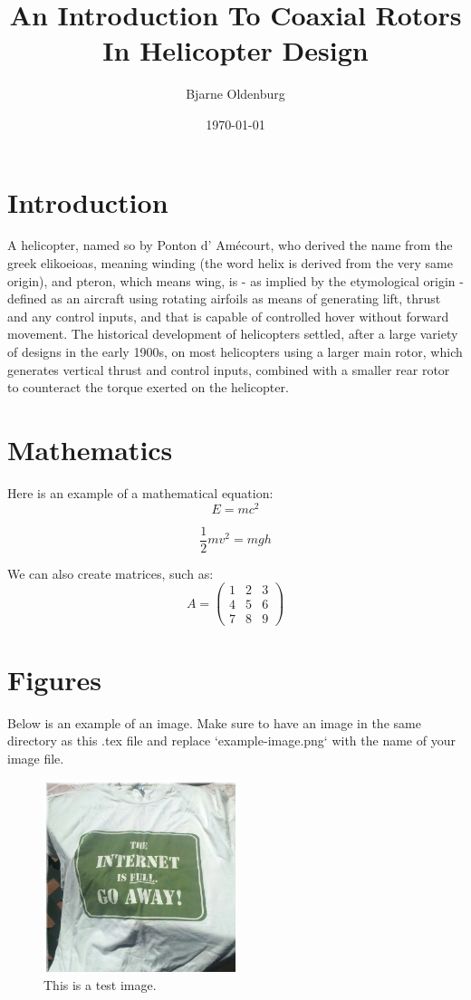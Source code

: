 \documentclass[11pt, a4paper]{scrartcl}
\title{An Introduction To Coaxial Rotors In Helicopter Design}
\author{Bjarne Oldenburg}
\date{\today}
\begin{document}
\maketitle

\section{Introduction}
A helicopter, named so by Ponton d' Amécourt, who derived the name from the greek elikoeioas, meaning winding (the word helix is derived from the very same origin), 
and pteron, which means wing, is - as implied by the etymological origin - defined as an aircraft using rotating airfoils as means of generating lift, thrust and any control inputs, and that is capable of controlled hover without forward movement.
The historical development of helicopters settled, after a large variety of designs in the early 1900s, on most helicopters using a larger main rotor, 
which generates vertical thrust and control inputs, combined with a smaller rear rotor to counteract the torque exerted on the helicopter.

\section{Mathematics}
Here is an example of a mathematical equation:
\begin{equation}
    E = mc^2
\end{equation}

\begin{equation}
    \frac{1}{2}mv^2 = mgh
\end{equation} 

We can also create matrices, such as:
\[
    A = \begin{pmatrix}
    1 & 2 & 3 \\
    4 & 5 & 6 \\
    7 & 8 & 9
    \end{pmatrix}
\]

\section{Figures}
Below is an example of an image. Make sure to have an image in the same directory as this .tex file and replace `example-image.png` with the name of your image file.

\begin{figure}[!ht]
    \centering
    \includegraphics[width=0.5\textwidth]{test.png}
    \caption{This is a test image.}
    \label{fig:testimage}
\end{figure}
\end{document}
